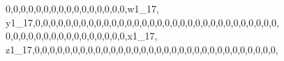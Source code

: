 \documentclass[]{article}
\newenvironment{Shaded}{\begin{snugshade}}{\end{snugshade}}
\newcommand{\DecValTok}[1]{\textcolor[rgb]{0.00,0.00,0.81}{#1}}
\newcommand{\NormalTok}[1]{#1}
\begin{document}
\begin{Shaded}
\begin{Highlighting}[]
\DecValTok{0}\NormalTok{,}\DecValTok{0}\NormalTok{,}\DecValTok{0}\NormalTok{,}\DecValTok{0}\NormalTok{,}\DecValTok{0}\NormalTok{,}\DecValTok{0}\NormalTok{,}\DecValTok{0}\NormalTok{,}\DecValTok{0}\NormalTok{,}\DecValTok{0}\NormalTok{,}\DecValTok{0}\NormalTok{,}\DecValTok{0}\NormalTok{,}\DecValTok{0}\NormalTok{,}\DecValTok{0}\NormalTok{,}\DecValTok{0}\NormalTok{,}\DecValTok{0}\NormalTok{,}\DecValTok{0}\NormalTok{,w1_}\DecValTok{17}\NormalTok{, y1_}\DecValTok{17}\NormalTok{,}\DecValTok{0}\NormalTok{,}\DecValTok{0}\NormalTok{,}\DecValTok{0}\NormalTok{,}\DecValTok{0}\NormalTok{,}\DecValTok{0}\NormalTok{,}\DecValTok{0}\NormalTok{,}\DecValTok{0}\NormalTok{,}\DecValTok{0}\NormalTok{,}\DecValTok{0}\NormalTok{,}\DecValTok{0}\NormalTok{,}\DecValTok{0}\NormalTok{,}\DecValTok{0}\NormalTok{,}\DecValTok{0}\NormalTok{,}\DecValTok{0}\NormalTok{,}\DecValTok{0}\NormalTok{,}\DecValTok{0}\NormalTok{,}\DecValTok{0}\NormalTok{,}\DecValTok{0}\NormalTok{,}\DecValTok{0}\NormalTok{,}\DecValTok{0}\NormalTok{,}\DecValTok{0}\NormalTok{,}\DecValTok{0}\NormalTok{,}\DecValTok{0}\NormalTok{,}\DecValTok{0}\NormalTok{,}\DecValTok{0}\NormalTok{,}\DecValTok{0}\NormalTok{,}\DecValTok{0}\NormalTok{,}\DecValTok{0}\NormalTok{,}\DecValTok{0}\NormalTok{,}\DecValTok{0}\NormalTok{,}\DecValTok{0}\NormalTok{,}\DecValTok{0}\NormalTok{,}
\DecValTok{0}\NormalTok{,}\DecValTok{0}\NormalTok{,}\DecValTok{0}\NormalTok{,}\DecValTok{0}\NormalTok{,}\DecValTok{0}\NormalTok{,}\DecValTok{0}\NormalTok{,}\DecValTok{0}\NormalTok{,}\DecValTok{0}\NormalTok{,}\DecValTok{0}\NormalTok{,}\DecValTok{0}\NormalTok{,}\DecValTok{0}\NormalTok{,}\DecValTok{0}\NormalTok{,}\DecValTok{0}\NormalTok{,}\DecValTok{0}\NormalTok{,}\DecValTok{0}\NormalTok{,}\DecValTok{0}\NormalTok{,x1_}\DecValTok{17}\NormalTok{, z1_}\DecValTok{17}\NormalTok{,}\DecValTok{0}\NormalTok{,}\DecValTok{0}\NormalTok{,}\DecValTok{0}\NormalTok{,}\DecValTok{0}\NormalTok{,}\DecValTok{0}\NormalTok{,}\DecValTok{0}\NormalTok{,}\DecValTok{0}\NormalTok{,}\DecValTok{0}\NormalTok{,}\DecValTok{0}\NormalTok{,}\DecValTok{0}\NormalTok{,}\DecValTok{0}\NormalTok{,}\DecValTok{0}\NormalTok{,}\DecValTok{0}\NormalTok{,}\DecValTok{0}\NormalTok{,}\DecValTok{0}\NormalTok{,}\DecValTok{0}\NormalTok{,}\DecValTok{0}\NormalTok{,}\DecValTok{0}\NormalTok{,}\DecValTok{0}\NormalTok{,}\DecValTok{0}\NormalTok{,}\DecValTok{0}\NormalTok{,}\DecValTok{0}\NormalTok{,}\DecValTok{0}\NormalTok{,}\DecValTok{0}\NormalTok{,}\DecValTok{0}\NormalTok{,}\DecValTok{0}\NormalTok{,}\DecValTok{0}\NormalTok{,}\DecValTok{0}\NormalTok{,}\DecValTok{0}\NormalTok{,}\DecValTok{0}\NormalTok{,}\DecValTok{0}\NormalTok{,}\DecValTok{0}\NormalTok{,}

\end{Highlighting}
\end{Shaded}
\end{document}
